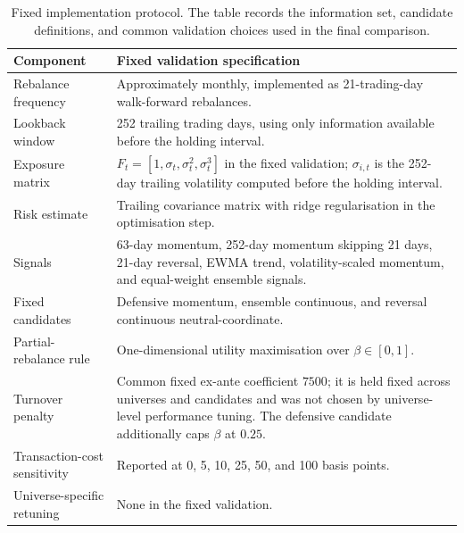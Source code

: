 \documentclass[11pt]{article}
\begin{document}
\begin{table}[!htbp]
\centering
\small
\begin{tabular}{lp{4.25in}}
\toprule
Component & Fixed validation specification \\
\midrule
Rebalance frequency & Approximately monthly, implemented as 21-trading-day walk-forward rebalances. \\
Lookback window & 252 trailing trading days, using only information available before the holding interval. \\
Exposure matrix & $F_t=[1,\sigma_t,\sigma_t^2,\sigma_t^3]$ in the fixed validation; $\sigma_{i,t}$ is the 252-day trailing volatility computed before the holding interval. \\
Risk estimate & Trailing covariance matrix with ridge regularisation in the optimisation step. \\
Signals & 63-day momentum, 252-day momentum skipping 21 days, 21-day reversal, EWMA trend, volatility-scaled momentum, and equal-weight ensemble signals. \\
Fixed candidates & Defensive momentum, ensemble continuous, and reversal continuous neutral-coordinate. \\
Partial-rebalance rule & One-dimensional utility maximisation over $\beta\in[0,1]$. \\
Turnover penalty & Common fixed ex-ante coefficient $7500$; it is held fixed across universes and candidates and was not chosen by universe-level performance tuning.  The defensive candidate additionally caps $\beta$ at $0.25$. \\
Transaction-cost sensitivity & Reported at 0, 5, 10, 25, 50, and 100 basis points. \\
Universe-specific retuning & None in the fixed validation. \\
\bottomrule
\end{tabular}
\caption{Fixed implementation protocol.  The table records the information set, candidate definitions, and common validation choices used in the final comparison.}
\label{tab:implementation-protocol}
\end{table}
\end{document}
